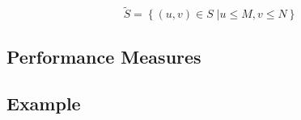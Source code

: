 \begin{equation}
    \tilde S = \left\{ (u, v) \in S\;| u \leq M, v\leq N \right\}
\end{equation}




\subsection{Performance Measures}

\subsection{Example}
